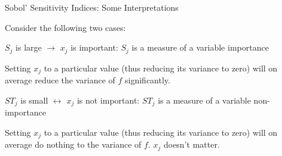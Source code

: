 \documentclass[english,aspectratio=169]{beamer}
\let\tempone\itemize
\let\temptwo\enditemize
\renewenvironment{itemize}{\tempone\addtolength{\itemsep}{0.35\baselineskip}}{\temptwo}
\renewcommand{\emph}[1]{\textcolor[HTML]{006d2c}{\fontseries{sb}\selectfont #1}}
\begin{document}
\begin{frame}[fragile]{Sobol' Sensitivity Indices: Some Interpretations}
\small

Consider the following two cases:

\vspace{1.0em}

\begin{itemize}
  \item $S_j$ is large $\rightarrow$ $x_j$ is important: $S_j$ is a measure of a variable \emph{importance}
  
  \begin{exampleblock}{}
    \centering
    Setting $x_j$ to a particular value (thus reducing its variance to zero) will on average reduce the variance of $f$
    significantly.      
  \end{exampleblock}

  \item $ST_j$ is small $\leftrightarrow$ $x_j$ is not important: $ST_j$ is a measure of a variable \emph{non-importance}

  \begin{exampleblock}{}
    \centering
    Setting $x_j$ to a particular value (thus reducing its variance to zero) will on average do nothing to the variance of $f$.
    $x_j$ doesn't matter.
  \end{exampleblock}

\end{itemize}

\end{frame}
\end{document}
